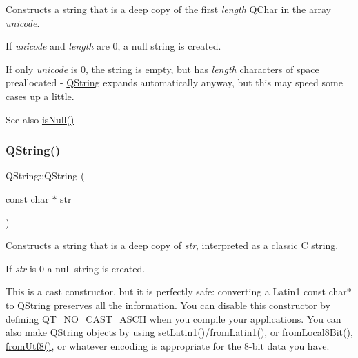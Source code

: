 Constructs a string that is a deep copy of the first {\itshape length} \mbox{\hyperlink{class_q_char}{Q\+Char}} in the array {\itshape unicode}.

If {\itshape unicode} and {\itshape length} are 0, a null string is created.

If only {\itshape unicode} is 0, the string is empty, but has {\itshape length} characters of space preallocated -\/ \mbox{\hyperlink{class_q_string}{Q\+String}} expands automatically anyway, but this may speed some cases up a little.

\begin{DoxySeeAlso}{See also}
\mbox{\hyperlink{class_q_string_a6a6da156364a32ef91e35f83b1955acc}{is\+Null()}} 
\end{DoxySeeAlso}
\mbox{\label{class_q_string_ac86c64fc0edc5d4c7347180dfa51e1d0}} 
\subsubsection{\texorpdfstring{QString()}{QString()}\hspace{0.1cm}{\footnotesize\ttfamily [6/6]}}
{\footnotesize\ttfamily Q\+String\+::\+Q\+String (\begin{DoxyParamCaption}\item[{const char $\ast$}]{str }\end{DoxyParamCaption})}

Constructs a string that is a deep copy of {\itshape str}, interpreted as a classic \mbox{\hyperlink{class_c}{C}} string.

If {\itshape str} is 0 a null string is created.

This is a cast constructor, but it is perfectly safe\+: converting a Latin1 const char$\ast$ to \mbox{\hyperlink{class_q_string}{Q\+String}} preserves all the information. You can disable this constructor by defining Q\+T\+\_\+\+N\+O\+\_\+\+C\+A\+S\+T\+\_\+\+A\+S\+C\+II when you compile your applications. You can also make \mbox{\hyperlink{class_q_string}{Q\+String}} objects by using \mbox{\hyperlink{class_q_string_ab7df9df250d260fd19067f9c921c0047}{set\+Latin1()}}/from\+Latin1(), or \mbox{\hyperlink{class_q_string_ad1175d375e2a8fee8e6411b855c63afb}{from\+Local8\+Bit()}}, \mbox{\hyperlink{class_q_string_a3e1b40400c137f234bfd2fd73405bca7}{from\+Utf8()}}, or whatever encoding is appropriate for the 8-\/bit data you have.

